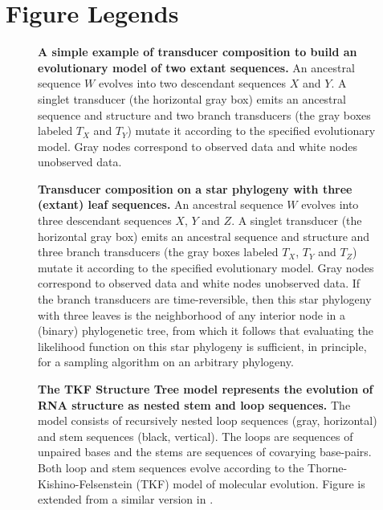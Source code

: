 \documentclass[10pt]{article}
\begin{document}


\clearpage
\section*{Figure Legends}

\begin{figure}[!ht]
  \centering
   \caption{
     \textbf{A simple example of transducer composition to build an
       evolutionary model of two extant sequences.}
    An ancestral sequence $W$ evolves into two descendant sequences $X$ and $Y$.
     A singlet transducer (the horizontal gray box) emits an ancestral sequence and structure
     and two branch transducers (the gray boxes labeled $T_X$ and $T_Y$)
     mutate it according to the specified evolutionary model.
     Gray nodes correspond to observed data and white nodes unobserved data.
   }
 \end{figure}
 
 \begin{figure}[!ht]
   \centering
   \caption{
     \textbf{Transducer composition on a star phylogeny with three
       (extant) leaf sequences.}
     An ancestral sequence $W$ evolves into three descendant sequences $X$, $Y$ and $Z$.
     A singlet transducer (the horizontal gray box) emits an ancestral sequence and structure
     and three branch transducers (the gray boxes labeled $T_X$, $T_Y$ and $T_Z$)
     mutate it according to the specified evolutionary model.
     Gray nodes correspond to observed data and white nodes unobserved data.
     If the branch transducers are time-reversible, then this star phylogeny with three leaves is
     the neighborhood of any interior node in a (binary) phylogenetic tree, 
     from which it follows that evaluating the likelihood function
     on this star phylogeny is sufficient, in principle, for a sampling algorithm on an arbitrary phylogeny.
   }
 \end{figure}
 
\begin{figure}[!ht]
  \centering
  \caption{
    \textbf{The TKF Structure Tree model represents the
      evolution of RNA structure as nested stem and loop sequences.}
    The model consists of recursively nested loop sequences (gray,
    horizontal) and stem sequences (black, vertical). The loops are
    sequences of unpaired bases and the stems are sequences of
    covarying base-pairs. Both loop and stem sequences evolve
    according to the Thorne-Kishino-Felsenstein (TKF) model
    \cite{ThorneEtal91} of molecular evolution.  Figure is extended
    from a similar version in \cite{Holmes2004}.
  }
\end{figure}
\end{document}
